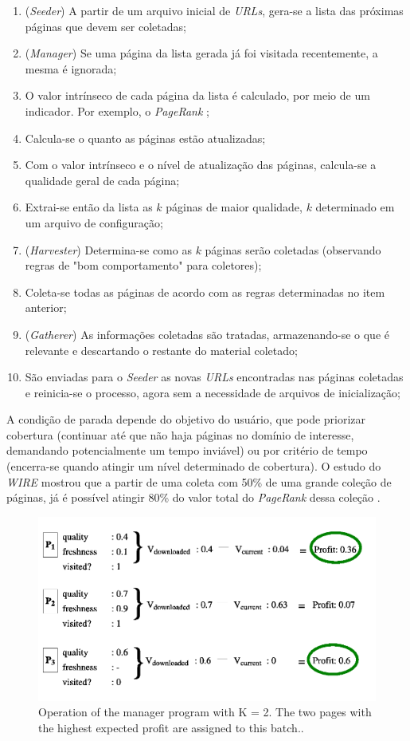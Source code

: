 \documentclass[a4paper,12pt,titlepage]{article}
\begin{document}
\begin{enumerate}
\item (\textit{Seeder}) A partir de um arquivo inicial de \textit{URLs}, gera-se a lista das próximas páginas que devem ser coletadas;
\item (\textit{Manager}) Se uma página da lista gerada já foi visitada recentemente, a mesma é ignorada;
\item O valor intrínseco de cada página da lista é calculado, por meio de um indicador. Por exemplo, o \textit{PageRank} \cite{pagerank};
\item Calcula-se o quanto as páginas estão atualizadas;
\item Com o valor intrínseco e o nível de atualização das páginas, calcula-se a qualidade geral de cada página;
\item Extrai-se então da lista as $k$ páginas de maior qualidade, $k$ determinado em um arquivo de configuração;
\item (\textit{Harvester}) Determina-se como as $k$ páginas serão coletadas (observando regras de "bom comportamento" para coletores);
\item Coleta-se todas as páginas de acordo com as regras determinadas no item anterior;
\item (\textit{Gatherer}) As informações coletadas são tratadas, armazenando-se o que é relevante e descartando o restante do material coletado;
\item São enviadas para o \textit{Seeder} as novas \textit{URLs} encontradas nas páginas coletadas e reinicia-se o processo, agora sem a necessidade de arquivos de inicialização;
\end{enumerate}

A condição de parada depende do objetivo do usuário, que pode priorizar cobertura (continuar até que não haja páginas no domínio de interesse, demandando potencialmente um tempo inviável) ou por critério de tempo (encerra-se quando atingir um nível determinado de cobertura). O estudo do \textit{WIRE} mostrou que a partir de uma coleta com 50\% de uma grande coleção de páginas, já é possível atingir 80\% do valor total do \textit{PageRank} dessa coleção \cite{carlos}.


\begin{figure}[H]
     \centering
     \includegraphics[scale=0.4]{figures/manager.png}
     \caption{Operation of the manager program with K = 2. The two pages with the highest expected profit are assigned to this batch..}
     \label{bsp}
\end{figure}
\end{document}

